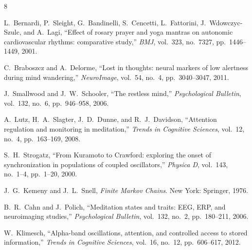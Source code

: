 \documentclass[journal]{IEEEtran}
\theoremstyle{definition}
\theoremstyle{remark}
\begin{document}
\appendix

\begin{thebibliography}{8}

L.~Bernardi, P.~Sleight, G.~Bandinelli, S.~Cencetti, L.~Fattorini, J.~Wdowczyc-Szulc, and A.~Lagi,
``Effect of rosary prayer and yoga mantras on autonomic cardiovascular rhythms: comparative study,''
\emph{BMJ}, vol.~323, no.~7327, pp.~1446--1449, 2001.

C.~Braboszcz and A.~Delorme,
``Lost in thoughts: neural markers of low alertness during mind wandering,''
\emph{NeuroImage}, vol.~54, no.~4, pp.~3040--3047, 2011.

J.~Smallwood and J.~W.~Schooler,
``The restless mind,''
\emph{Psychological Bulletin}, vol.~132, no.~6, pp.~946--958, 2006.

A.~Lutz, H.~A.~Slagter, J.~D.~Dunne, and R.~J.~Davidson,
``Attention regulation and monitoring in meditation,''
\emph{Trends in Cognitive Sciences}, vol.~12, no.~4, pp.~163--169, 2008.

S.~H.~Strogatz,
``From Kuramoto to Crawford: exploring the onset of synchronization in populations of coupled oscillators,''
\emph{Physica D}, vol.~143, no.~1--4, pp.~1--20, 2000.

J.~G.~Kemeny and J.~L.~Snell,
\emph{Finite Markov Chains}.
New York: Springer, 1976.

B.~R.~Cahn and J.~Polich,
``Meditation states and traits: EEG, ERP, and neuroimaging studies,''
\emph{Psychological Bulletin}, vol.~132, no.~2, pp.~180--211, 2006.

W.~Klimesch,
``Alpha-band oscillations, attention, and controlled access to stored information,''
\emph{Trends in Cognitive Sciences}, vol.~16, no.~12, pp.~606--617, 2012.

\end{thebibliography}
\end{document}
